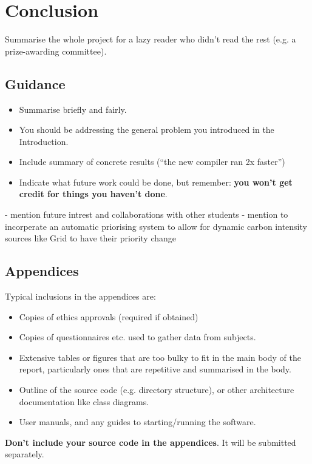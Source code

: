 \documentclass{l4proj}
\begin{document}
\chapter{Conclusion}    
Summarise the whole project for a lazy reader who didn't read the rest (e.g. a prize-awarding committee).
\section{Guidance}
\begin{itemize}
    \item
        Summarise briefly and fairly.
    \item
        You should be addressing the general problem you introduced in the
        Introduction.        
    \item
        Include summary of concrete results (``the new compiler ran 2x
        faster'')
    \item
        Indicate what future work could be done, but remember: \textbf{you
        won't get credit for things you haven't done}.
\end{itemize}
- mention future intrest and collaborations with other students
- mention to incorperate an automatic priorising system to allow for dynamic carbon intensity sources like Grid to have their priority change
%
% 

\begin{appendices}

\chapter{Appendices}

Typical inclusions in the appendices are:

\begin{itemize}
\item
  Copies of ethics approvals (required if obtained)
\item
  Copies of questionnaires etc. used to gather data from subjects.
\item
  Extensive tables or figures that are too bulky to fit in the main body of
  the report, particularly ones that are repetitive and summarised in the body.

\item Outline of the source code (e.g. directory structure), or other architecture documentation like class diagrams.

\item User manuals, and any guides to starting/running the software.

\end{itemize}

\textbf{Don't include your source code in the appendices}. It will be
submitted separately.

\end{appendices}
\end{document}
